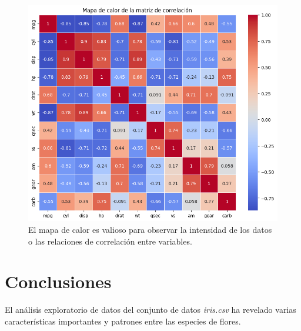 \documentclass[conference]{IEEEtran}
\begin{document}
            \begin{figure}[h]
                \centering
                \includegraphics[width=0.95\linewidth]{mtcarsGraf2.png}
                \caption{El mapa de calor es valioso para observar la intensidad de los datos o las relaciones de correlación entre variables.}
            \end{figure}
        
\section{Conclusiones}

    El análisis exploratorio de datos del conjunto de datos \textit{iris.csv} ha revelado varias características importantes y patrones entre las especies de flores.
\end{document}
